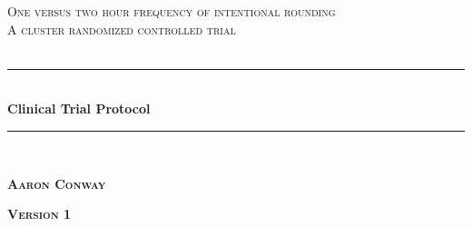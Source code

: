 \documentclass[12pt]{article}
\begin{document}
\begin{titlepage}

\newcommand{\HRule}{\rule{\linewidth}{0.5mm}} %

\center %
 

\textsc{\LARGE One versus two hour frequency of intentional rounding}\\[1.5cm] %
\textsc{\Large A cluster randomized controlled trial}\\[0.5cm] %
\textsc{\large }\\[0.5cm] %


\HRule \\[0.6cm]
{ \huge \bfseries Clinical Trial Protocol}\\[0.4cm] %
\HRule \\[1.0cm]
 

\begin{center} \large
\medskip
{\textsc{\textbf{Aaron Conway} }}    
\end{center}

\begin{center} \Large
{\textsc{\textbf{Version 1} }} 
\end{center}

~


\end{titlepage}
\end{document}
